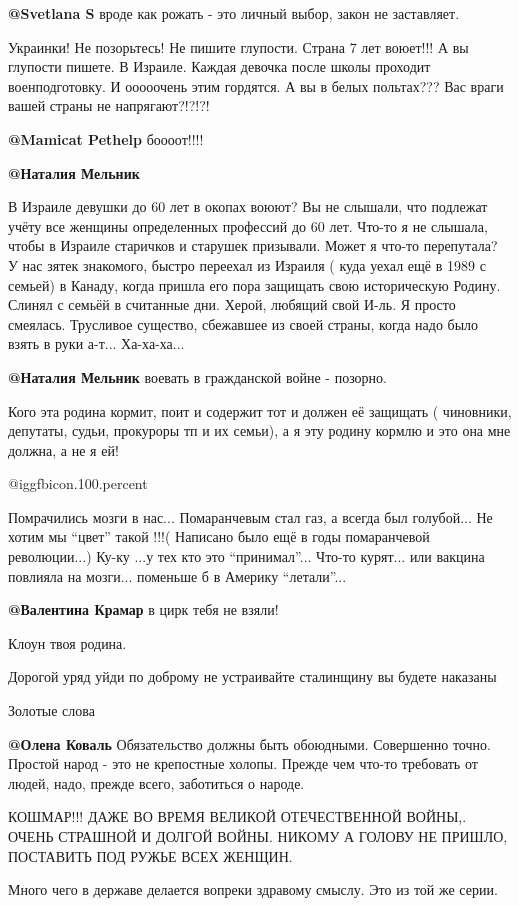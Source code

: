 \begin{itemize}
\textbf{@Svetlana S}  вроде как рожать - это личный выбор, закон не заставляет.


Украинки! Не позорьтесь! Не пишите глупости. Страна 7 лет воюет!!!  А вы
глупости пишете. В Израиле. Каждая девочка после школы проходит военподготовку.
И ооооочень этим гордятся. А вы в белых польтах??? Вас враги вашей страны не
напрягают?!?!?!

\textbf{@Mamicat Pethelp}  боооот!!!!

\textbf{@Наталия Мельник}  

В Израиле девушки до 60 лет в окопах воюют? Вы не слышали, что подлежат учёту
все  женщины определенных профессий до 60 лет. Что-то я не слышала, чтобы в
Израиле старичков и старушек призывали. Может я что-то перепутала? У нас зятек
знакомого, быстро переехал из Израиля ( куда уехал ещё в 1989 с семьей)  в
Канаду, когда пришла его пора защищать свою историческую Родину. Слинял с
семьёй в считанные дни. Херой, любящий свой И-ль. Я просто смеялась. Трусливое
существо, сбежавшее из своей страны, когда надо было взять в руки а-т...
Ха-ха-ха... 

\textbf{@Наталия Мельник}  воевать в гражданской войне - позорно. 

\end{itemize} %


Кого эта родина кормит, поит и содержит тот и должен её защищать ( чиновники,
депутаты, судьи, прокуроры тп  и их семьи), а я эту родину кормлю и это она мне
должна, а не я ей! 

\begin{itemize} %
 @igg{fbicon.100.percent} 


Помрачились мозги в нас... Помаранчевым стал газ, а всегда был голубой... Не
хотим мы \enquote{цвет} такой !!!( Написано было ещё в годы помаранчевой революции...)
Ку-ку ...у тех кто это \enquote{принимал}... Что-то курят... или вакцина повлияла на
мозги... поменьше б в Америку \enquote{летали}...

\textbf{@Валентина Крамар}  в цирк тебя не взяли!

Клоун твоя родина.

Дорогой уряд уйди по доброму не устраивайте сталинщину вы будете наказаны 

Золотые слова

\textbf{@Олена Коваль}  Обязательство должны быть обоюдными. Совершенно точно. Простой народ - это не крепостные холопы. Прежде чем что-то требовать от людей, надо, прежде всего, заботиться о народе. 
\end{itemize} %


КОШМАР!!!  ДАЖЕ ВО ВРЕМЯ ВЕЛИКОЙ ОТЕЧЕСТВЕННОЙ ВОЙНЫ,. ОЧЕНЬ СТРАШНОЙ И ДОЛГОЙ
ВОЙНЫ.  НИКОМУ А ГОЛОВУ НЕ ПРИШЛО, ПОСТАВИТЬ ПОД РУЖЬЕ  ВСЕХ ЖЕНЩИН.


Много чего в державе делается вопреки здравому смыслу. Это из той же серии. 

